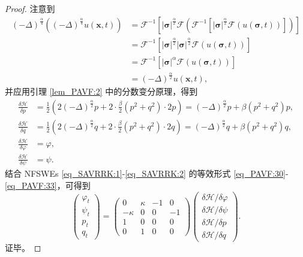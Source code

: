 \begin{proof}
注意到
\begin{align}\label{eq_PAVF:12071}
(-\Delta)^{\frac{\alpha}{4}}((-\Delta)^{\frac{\alpha}{4}}  u(\boldsymbol{x},t))&=\mathcal{F}^{-1}\left[|\boldsymbol{\sigma}|^{\frac{\alpha}{2}} \mathcal{F}(\mathcal{F}^{-1}\left[|\boldsymbol{\sigma}|^{\frac{\alpha}{2}} \mathcal{F}(u(\boldsymbol{\sigma},t))\right])\right]\nonumber\\
&=\mathcal{F}^{-1}\left[|\boldsymbol{\sigma}|^{\frac{\alpha}{2}} |\boldsymbol{\sigma}|^{\frac{\alpha}{2}} \mathcal{F}(u(\boldsymbol{\sigma},t))\right]\nonumber\\
&=\mathcal{F}^{-1}\left[|\boldsymbol{\sigma}|^{\alpha} \mathcal{F}(u(\boldsymbol{\sigma},t))\right]\nonumber\\
&=(-\Delta)^{\frac{\alpha}{2}} u(\boldsymbol{x},t),
\end{align}
并应用引理 \ref{lem_PAVF:2} 中的分数变分原理，得到
\begin{align}
\frac{\delta \mathcal{H}}{\delta p} &=\frac{1}{2}\left(2(-\Delta)^{\frac{\alpha}{2}} p+2 \cdot \frac{\beta}{2}\left(p^{2}+q^{2}\right) \cdot 2 p\right)=(-\Delta)^{\frac{\alpha}{2}}p+\beta\left(p^{2}+q^{2}\right) p,\label{eq_PAVF:38a}\\
\frac{\delta \mathcal{H}}{\delta q} &=\frac{1}{2}\left(2(-\Delta)^{\frac{\alpha}{2}} q+2 \cdot \frac{\beta}{2}\left(p^{2}+q^{2}\right) \cdot 2 q\right)=(-\Delta)^{\frac{\alpha}{2}}q+\beta\left(p^{2}+q^{2}\right) q,\label{eq_PAVF:38b}\\
\frac{\delta \mathcal{H}}{\delta \varphi} &=\varphi,\label{eq_PAVF:38c}\\
\frac{\delta \mathcal{H}}{\delta \psi} &=\psi.\label{eq_PAVF:38}
\end{align}
结合 NFSWEs \eqref{eq_SAVRRK:1}-\eqref{eq_SAVRRK:2} 的等效形式 \eqref{eq_PAVF:30}-\eqref{eq_PAVF:33}，可得到
\begin{equation}\label{eq_PAVF:39}
\left(\begin{array}{l}
		\varphi_{t} \\
		\psi_{t} \\
		p_{t} \\
		q_{t}
\end{array}\right)
=\left(\begin{array}{cccc}
			0 & \kappa & -1 & 0 \\
			-\kappa & 0 & 0 & -1 \\
			1 & 0 & 0 & 0 \\
			0 & 1 & 0 & 0
\end{array}\right)
\left(\begin{array}{l}
		\delta \mathcal{H} / \delta \varphi \\
		\delta \mathcal{H} / \delta \psi \\
		\delta \mathcal{H} / \delta p \\
		\delta \mathcal{H} / \delta q
\end{array}\right).
\end{equation}
证毕。
\end{proof}

